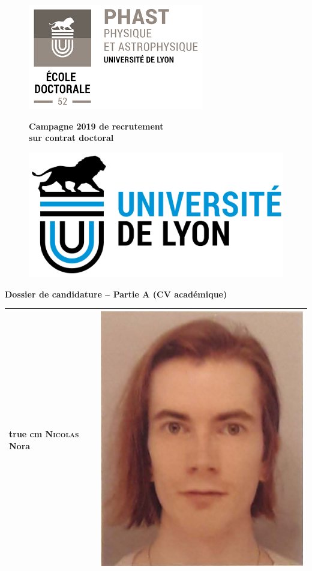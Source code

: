 \documentclass[11pt,a4]{article}
\begin{document}

\begin{figure}
    \begin{minipage}[c]{.06\linewidth}
        \includegraphics[width = 3.5 true cm]{../phast-logo.png}
    \end{minipage} \hfill
    \begin{minipage}[c]{.66\linewidth}
        \begin{center}
            {\bf \Large Campagne 2019 de recrutement \\ sur contrat doctoral}
        \end{center}
    \end{minipage}
    \begin{minipage}[c]{.06\linewidth}
        \includegraphics[width = 3.5 true cm]{../UdL-logo.png}
    \end{minipage}
\end{figure}

\begin{center}
    {\bf \Large Dossier de candidature -- Partie A (CV académique)}
\end{center}


\begin{center}
    \begin{tabular}{|m{12cm}|m{4cm}|} \hline
    \vspace{1.5cm} {\hskip 5 true cm} \textsc{Nicolas} Nora \vspace{1.5cm}
    & \hspace{.7cm} \includegraphics[width = 2 cm]{../nora_pid.png}
        \\ \hline
    \end{tabular}
\end{center}
\end{document}
